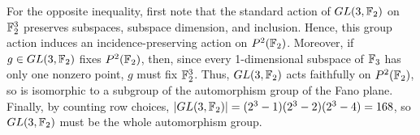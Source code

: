 \documentclass{article}
\begin{document}
For the opposite inequality, first note that the standard action of $GL(3, \mathbb{F}_2)$ on $\mathbb{F}_2^3$ preserves subspaces, subspace dimension, and inclusion. Hence, this group action induces an incidence-preserving action on $P^2(\mathbb{F}_2)$.  Moreover, if $g \in GL(3, \mathbb{F}_2)$ fixes $P^2(\mathbb{F}_2)$, then, since every 1-dimensional subspace of $\mathbb{F}_3$ has only one nonzero point, $g$ must fix $\mathbb{F}_2^3$. Thus, $GL(3, \mathbb{F}_2)$ acts faithfully on $P^2(\mathbb{F}_2)$, so is isomorphic to a subgroup of the automorphism group of the Fano plane.   Finally, by counting row choices, $|GL(3, \mathbb{F}_2)| = (2^3 - 1)(2^3 - 2)(2^3 - 4) = 168$, so $GL(3, \mathbb{F}_2)$ must be the whole automorphism group.



\end{document}
